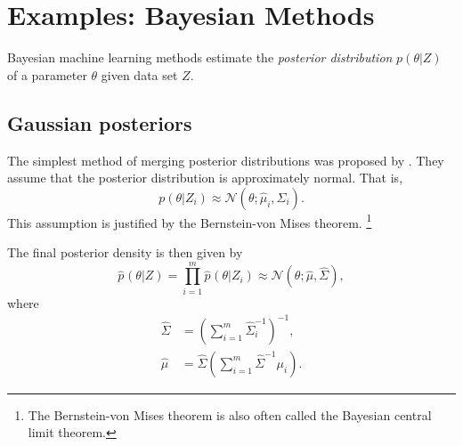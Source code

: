 \documentclass[thesis.tex]{subfiles}
\newcommand{\p}[1]{p({#1})}
\newcommand{\psup}[2]{\hat p^{#1}({#2})}
\newcommand{\phat}[1]{\psup{}{#1}}
\newcommand{\gaussian}[3]{\mathcal N({#1};{#2},{#3})}
\begin{document}
%
%
%


\section{Examples: Bayesian Methods}

Bayesian machine learning methods estimate the \emph{posterior distribution} $\p{\theta|Z}$ of a parameter $\theta$ given data set $Z$.


\subsection{Gaussian posteriors}

The simplest method of merging posterior distributions was proposed by \cite{neiswanger2013asymptotically}.
They assume that the posterior distribution is approximately normal.
That is,
\begin{equation}
    \p{\theta | Z_i}
    \approx
    \gaussian{\theta}{\hat\mu_i}{\hat\Sigma_i}
    .
\end{equation}
This assumption is justified by the Bernstein-von Mises theorem.%
\footnote{
    The Bernstein-von Mises theorem is also often called the Bayesian central limit theorem.
}

The final posterior density is then given by
\begin{equation}
    \phat{\theta | Z}
    =
    \prod_{i=1}^m
    \phat{\theta | Z_i}
    \approx
    \gaussian{\theta}{\hat\mu}{\hat\Sigma}
    ,
\end{equation}
where
\begin{align}
    \hat\Sigma
    &=
    \left(
        \sum_{i=1}^m
        \hat\Sigma_i^{-1}
    \right)^{-1}
    ,
    \\
    \hat\mu
    &=
    \hat\Sigma \left(\sum_{i=1}^m \hat\Sigma^{-1} \mu_i \right)
    .
\end{align}
\end{document}
